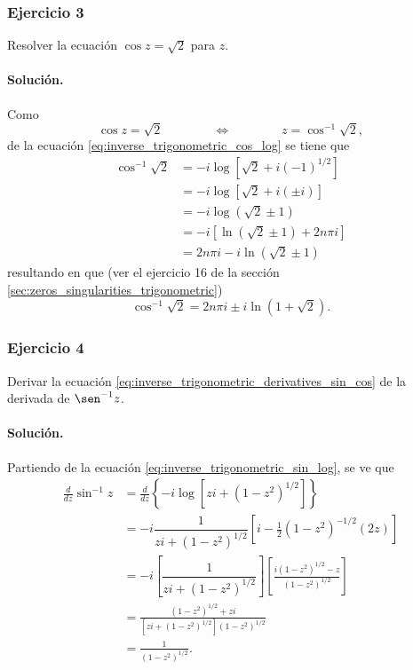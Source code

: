 \documentclass[a4paper]{report}
\begin{document}
\subsubsection{Ejercicio 3}

Resolver la ecuación \(\cos z=\sqrt{2}\) para \(z\).

\paragraph{Solución.} Como
\[
 \cos z=\sqrt{2}\qquad\qquad\Leftrightarrow\qquad\qquad z=\cos^{-1}\sqrt{2},
\]
de la ecuación \ref{eq:inverse_trigonometric_cos_log} se tiene que
\begin{align*}
 \cos^{-1}\sqrt{2}&=-i\log\left[\sqrt{2}+i(-1)^{1/2}\right]\\
   &=-i\log\left[\sqrt{2}+i(\pm i)\right]\\
   &=-i\log\left(\sqrt{2}\pm 1\right)\\
   &=-i\left[\ln\left(\sqrt{2}\pm 1\right)+2n\pi i\right]\\
   &=2n\pi i-i\ln\left(\sqrt{2}\pm 1\right)
\end{align*}
resultando en que (ver el ejercicio 16 de la sección \ref{sec:zeros_singularities_trigonometric})
\[
 \cos^{-1}\sqrt{2}=2n\pi i\pm i\ln\left(1+\sqrt{2}\right).
\]

\subsubsection{Ejercicio 4}

Derivar la ecuación \ref{eq:inverse_trigonometric_derivatives_sin_cos} de la derivada de \(\sen^{-1}z\).

\paragraph{Solución.} Partiendo de la ecuación \ref{eq:inverse_trigonometric_sin_log}, se ve que 
\begin{align*}
 \frac{d}{dz}\sin^{-1}z&=\frac{d}{dz}\left\{-i\log\left[zi+(1-z^2)^{1/2}\right]\right\}\\
  &=-i\dfrac{1}{zi+(1-z^2)^{1/2}}\left[i-\frac{1}{2}(1-z^2)^{-1/2}(2z)\right]\\ 
  &=-i\left[\dfrac{1}{zi+(1-z^2)^{1/2}}\right]\left[\frac{i(1-z^2)^{1/2}-z}{(1-z^2)^{1/2}}\right]\\
  &=\frac{(1-z^2)^{1/2}+zi}{[zi+(1-z^2)^{1/2}](1-z^2)^{1/2}}\\
  &=\frac{1}{(1-z^2)^{1/2}}.
\end{align*}
\end{document}
